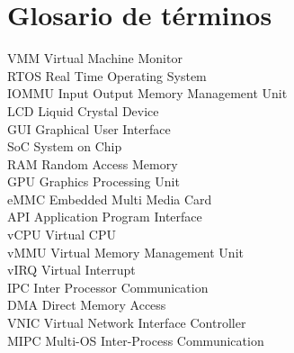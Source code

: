 \section{Glosario de términos}

VMM     Virtual Machine Monitor\\
RTOS    Real Time Operating System\\
IOMMU   Input Output Memory Management Unit\\
LCD     Liquid Crystal Device\\
GUI     Graphical User Interface\\
SoC     System on Chip\\
RAM     Random Access Memory\\
GPU     Graphics Processing Unit\\
eMMC    Embedded Multi Media Card\\
API     Application Program Interface\\
vCPU    Virtual CPU\\
vMMU    Virtual Memory Management Unit\\
vIRQ    Virtual Interrupt\\
IPC     Inter Processor Communication\\
DMA     Direct Memory Access\\
VNIC    Virtual Network Interface Controller\\
MIPC    Multi-OS Inter-Process Communication

\newpage
